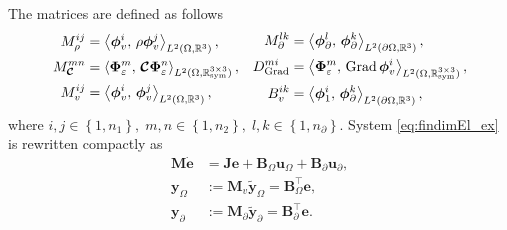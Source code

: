 	The matrices are defined as follows 
	\begin{equation}\label{eq:matricesElas}
	\begin{aligned}
	M_\rho^{ij} &= \inner[L^2(\Omega, \bbR^3)]{\bm\phi_v^i}{\rho \bm\phi_v^j}, \\
	M_{\bm{\mathcal{C}}}^{mn} &= \inner[L^2(\Omega, \bbR^{3\times 3}_{\text{sym}})]{\bm\Phi_\varepsilon^m}{\bm{\mathcal{C}}\bm\Phi_\varepsilon^n}, \\
	M_v^{ij} &= \inner[L^2(\Omega, \bbR^3)]{\bm\phi_v^i}{\bm\phi_v^j}, \\
	\end{aligned}\quad
	\begin{aligned}
	M_\partial^{lk} &= \inner[L^2(\partial \Omega, \mathbb{R}^3)]{\bm\phi_\partial^l}{\bm\phi_\partial^k}, \\
	{D}_{\Grad}^{mi} &= \inner[L^2(\Omega, \bbR^{3\times 3}_{\text{sym}})]{\bm\Phi_\varepsilon^m}{\Grad\bm\phi_v^i}, \\
	{B}_{v}^{ik} &= \inner[L^2(\partial \Omega, \mathbb{R}^3)]{\bm\phi_1^i}{\bm\phi_\partial^k}, \\
	\end{aligned}
	\end{equation}
	where $i, j \in \left\{1, n_1\right\}, \; m,n \in \left\{1, n_2\right\}, \; l, k \in \left\{1, n_\partial \right\}$. System \eqref{eq:findimEl_ex} is rewritten compactly as
\begin{equation}
\begin{aligned}
\mathbf{M} \dot{\mathbf{e}} &= \mathbf{J} \mathbf{e} + \mathbf{B}_\Omega \mathbf{u}_\Omega + \mathbf{B}_\partial \mathbf{u}_\partial, \\
\mathbf{y}_\Omega &:= \mathbf{M}_v \widetilde{\mathbf{y}}_\Omega = \mathbf{B}_\Omega^\top \mathbf{e},  \\
\mathbf{y}_\partial &:= \mathbf{M}_\partial \widetilde{\mathbf{y}}_\partial = \mathbf{B}_\partial^\top \mathbf{e}.
\end{aligned}
\end{equation}

